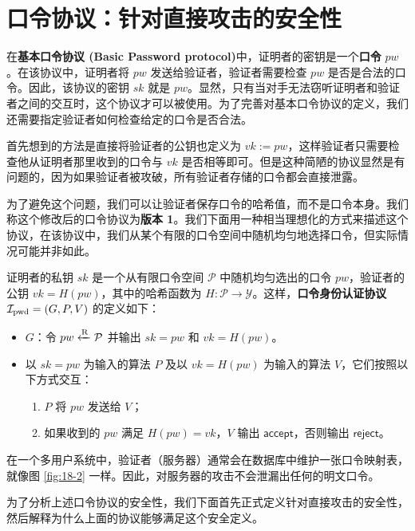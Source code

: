 \section{口令协议：针对直接攻击的安全性}\label{sec:18-3}

在\textbf{基本口令协议 (Basic Password protocol)}中，证明者的密钥是一个\textbf{口令} $pw$。在该协议中，证明者将 $pw$ 发送给验证者，验证者需要检查 $pw$ 是否是合法的口令。因此，该协议的密钥 $sk$ 就是 $pw$。显然，只有当对手无法窃听证明者和验证者之间的交互时，这个协议才可以被使用。为了完善对基本口令协议的定义，我们还需要指定验证者如何检查给定的口令是否合法。

首先想到的方法是直接将验证者的公钥也定义为 $vk:=pw$，这样验证者只需要检查他从证明者那里收到的口令与 $vk$ 是否相等即可。但是这种简陋的协议显然是有问题的，因为如果验证者被攻破，所有验证者存储的口令都会直接泄露。

为了避免这个问题，我们可以让验证者保存口令的哈希值，而不是口令本身。我们称这个修改后的口令协议为\textbf{版本 1}。我们下面用一种相当理想化的方式来描述这个协议，在该协议中，我们从某个有限的口令空间中随机均匀地选择口令，但实际情况可能并非如此。

\begin{snote}[口令协议版本 1.]
证明者的私钥 $sk$ 是一个从有限口令空间 $\mathcal P$ 中随机均匀选出的口令 $pw$，验证者的公钥 $vk=H(pw)$，其中的哈希函数为 $H:\mathcal{P}\to\mathcal{Y}$。这样，\textbf{口令身份认证协议} $\mathcal{I}_{\rm pwd}=(G,P,V)$ 的定义如下：
\begin{itemize}
    \item $G$：令 $pw\xleftarrow{\rm R}\mathcal{P}$ 并输出 $sk=pw$ 和 $vk=H(pw)$。
    \item 以 $sk=pw$ 为输入的算法 $P$ 及以 $vk=H(pw)$ 为输入的算法 $V$，它们按照以下方式交互：
    \begin{enumerate}
        \item $P$ 将 $pw$ 发送给 $V$；
        \item 如果收到的 $pw$ 满足 $H(pw)=vk$，$V$ 输出 $\mathsf{accept}$，否则输出 $\mathsf{reject}$。
    \end{enumerate}
\end{itemize}

在一个多用户系统中，验证者（服务器）通常会在数据库中维护一张口令映射表，就像图 \ref{fig:18-2} 一样。因此，对服务器的攻击不会泄漏出任何的明文口令。

为了分析上述口令协议的安全性，我们下面首先正式定义针对直接攻击的安全性，然后解释为什么上面的协议能够满足这个安全定义。
\end{snote}

